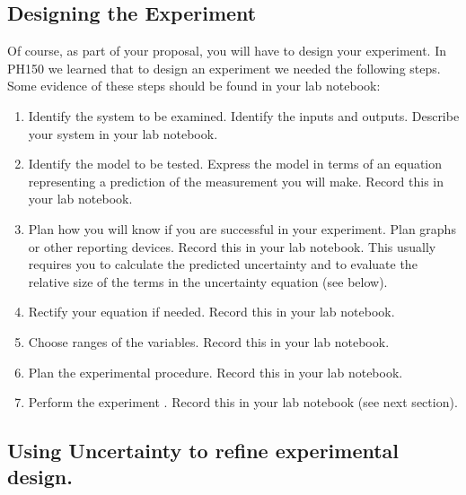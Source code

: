 \subsection{Designing the Experiment}

Of course, as part of your proposal, you will have to design your
experiment. In PH150 we learned that to design an experiment we needed the
following steps. Some evidence of these steps should be found in your lab
notebook:

\begin{enumerate}
\item Identify the system to be examined. Identify the inputs and outputs.
Describe your system in your lab notebook.

\item Identify the model to be tested. Express the model in terms of an
equation representing a prediction of the measurement you will make. Record
this in your lab notebook.

\item Plan how you will know if you are successful in your experiment. Plan
graphs or other reporting devices. Record this in your lab notebook. This
usually requires you to calculate the predicted uncertainty and to evaluate
the relative size of the terms in the uncertainty equation (see below).

\item Rectify your equation if needed. Record this in your lab notebook.

\item Choose ranges of the variables. Record this in your lab notebook.

\item Plan the experimental procedure. Record this in your lab notebook.

\item Perform the experiment . Record this in your lab notebook (see next
section).
\end{enumerate}

\subsection{Using Uncertainty to refine experimental design.}

